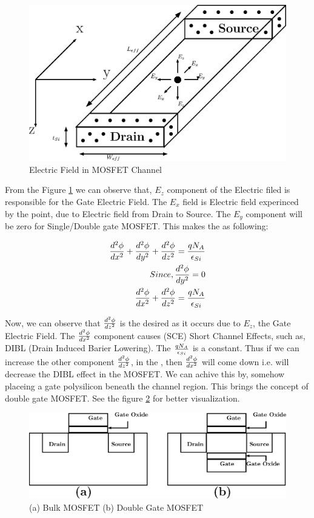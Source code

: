 \documentclass[a4paper]{article}
\begin{document}
\begin{figure}[!h]
  \includegraphics[scale=0.8]{./BulkFinFET-EField-in-Channel.eps}
  \caption{Electric Field in MOSFET Channel}
  \label{fig:E-Field-in-channel}
\end{figure}

From the Figure \ref{fig:E-Field-in-channel} we can observe that, $E_z$ component of the Electric filed is responsible for the Gate Electric Field. The $E_x$ field is Electric field experinced by the point, due to Electric field from Drain to Source. The $E_y$ component will be zero for Single/Double gate MOSFET. This makes the \PE as following:


\begin{align*}
  \frac {d^2\phi} {dx^2} + \frac {d^2\phi} {dy^2} + \frac {d^2\phi} {dz^2} = \frac{qN_A} {\epsilon_{Si}}\\
  Since, \frac {d^2\phi} {dy^2} = 0\\
  \frac {d^2\phi} {dx^2} + \frac {d^2\phi} {dz^2} = \frac{qN_A} {\epsilon_{Si}}
\end{align*}

Now, we can observe that $\frac {d^2\phi} {dz^2}$ is the desired as it occurs due to $E_z$, the Gate Electric Field. The $\frac {d^2\phi} {dx^2}$ component causes (SCE) Short Channel Effects, such as, DIBL (Drain Induced Barier Lowering). The $\frac{qN_A} {\epsilon_{Si}}$ is a constant. Thus if we can increase the other component $\frac {d^2\phi} {dz^2}$, in the \PE, then $\frac {d^2\phi} {dx^2}$ will come down i.e. will decrease the DIBL effect in the MOSFET. We can achive this by, somehow placeing a gate polysilicon beneath the channel region. This brings the concept of double gate MOSFET. See the figure \ref {fig:MOS-DGMOS} for better visualization.

\begin{figure}[!h]
  \includegraphics[scale=0.8]{./BulkFinFET-bulk-MOSFET.eps}
  \caption{(a) Bulk MOSFET (b) Double Gate MOSFET}
  \label{fig:MOS-DGMOS}
\end{figure}
\end{document}
